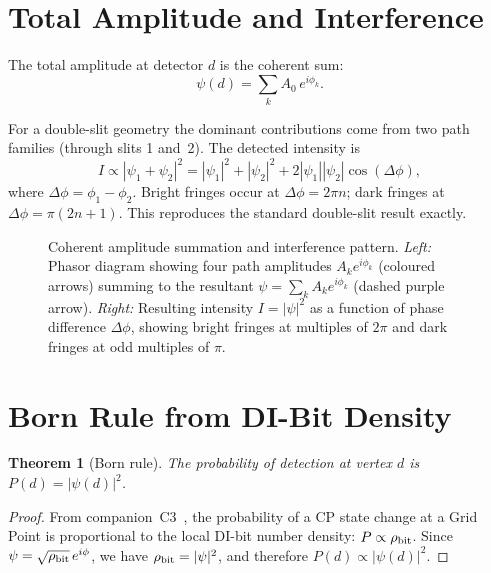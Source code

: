\documentclass[11pt,a4paper]{article}
\newtheorem{theorem}{Theorem}[section]
\begin{document}
\section{Total Amplitude and Interference}

The total amplitude at detector $d$ is the coherent sum:
\begin{equation}
\psi(d) = \sum_k A_0\,e^{i\phi_k}.
\label{eq:sum}
\end{equation}

For a double-slit geometry the dominant contributions come from two
path families (through slits 1 and~2).  The detected intensity is
\begin{equation}
I \propto |\psi_1 + \psi_2|^2
= |\psi_1|^2 + |\psi_2|^2 + 2|\psi_1||\psi_2|\cos(\Delta\phi),
\label{eq:interference}
\end{equation}
where $\Delta\phi = \phi_1 - \phi_2$.  Bright fringes occur at
$\Delta\phi = 2\pi n$; dark fringes at $\Delta\phi = \pi(2n+1)$.
This reproduces the standard double-slit result exactly.

\begin{figure}[H]
\centering

\caption{Coherent amplitude summation and interference pattern.
  \textit{Left:} Phasor diagram showing four path amplitudes
  $A_k e^{i\phi_k}$ (coloured arrows) summing to the resultant
  $\psi = \sum_k A_k e^{i\phi_k}$ (dashed purple arrow).
  \textit{Right:} Resulting intensity $I = |\psi|^2$ as a function of
  phase difference $\Delta\phi$, showing bright fringes at multiples
  of $2\pi$ and dark fringes at odd multiples of $\pi$.}
\label{fig:phasor}
\end{figure}

\section{Born Rule from DI-Bit Density}

\begin{theorem}[Born rule]
The probability of detection at vertex $d$ is $P(d) = |\psi(d)|^2$.
\end{theorem}

\begin{proof}
From companion~C3~\cite{abshier2026c3}, the probability of a CP state
change at a Grid Point is proportional to the local DI-bit number
density: $P \propto \rho_{\rm bit}$.  Since $\psi =
\sqrt{\rho_{\rm bit}}\,e^{i\phi}$, we have $\rho_{\rm bit} = |\psi|^2$,
and therefore $P(d) \propto |\psi(d)|^2$.
\end{proof}
\end{document}
